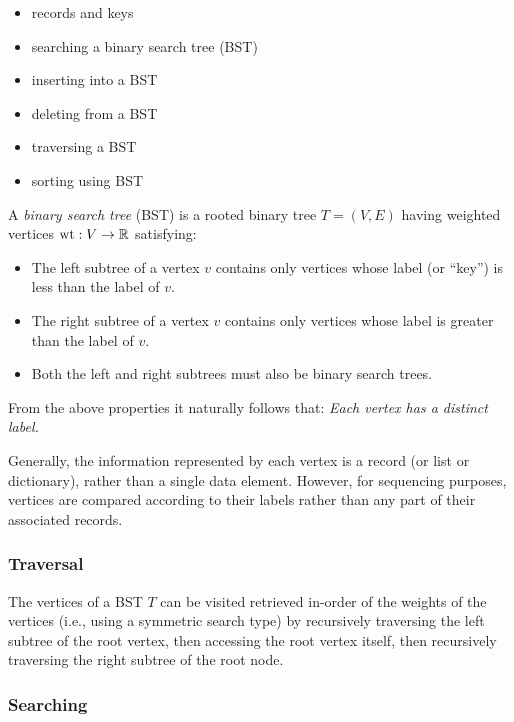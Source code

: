 \begin{itemize}
\item records and keys

\item searching a binary search tree (BST)

\item inserting into a BST

\item deleting from a BST

\item traversing a BST

\item sorting using BST
\end{itemize}

A {\it binary search tree} (BST) is a rooted binary tree
$T=(V,E)$ having weighted vertices ${\rm wt}:V\to {\mathbb{R}}$ satisfying:

\begin{itemize}
\item
 The left subtree of a vertex $v$ contains only vertices whose label
(or ``key'') is less than the label of $v$.
\item
The right subtree of a vertex $v$ contains only vertices whose label
  is greater than the label of $v$.
\item
Both the left and right subtrees must also be binary search trees.
\end{itemize}

From the above properties it naturally follows that:
{\it Each vertex has a distinct label.}

Generally, the information represented by each vertex is a
record (or list or dictionary), rather than a single data element. However,
for sequencing purposes, vertices are compared according to their
labels rather than any part of their associated records.

\subsubsection{Traversal}

The vertices of a BST $T$ can be visited retrieved in-order of the
weights of the vertices (i.e.,
using a symmetric search type) by recursively  traversing the left subtree of the
root vertex, then accessing the root vertex itself, then recursively traversing the
right subtree of the root node.

\subsubsection{Searching}

